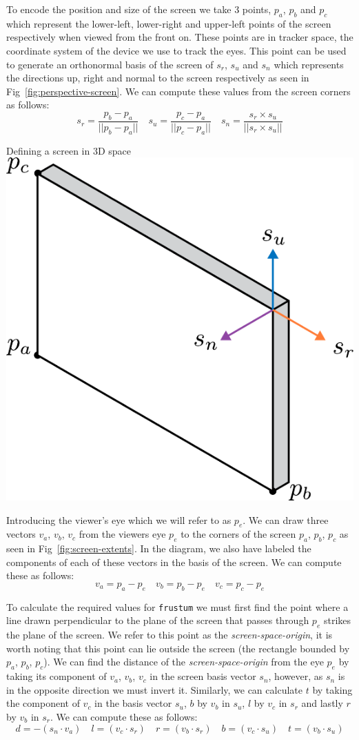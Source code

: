 To encode the position and size of the screen we take 3 points, $p_a$, $p_b$ and $p_c$ which represent the lower-left, lower-right and upper-left points of the screen respectively when viewed from the front on. These points are in tracker space, the coordinate system of the device we use to track the eyes. This point can be used to generate an orthonormal basis of the screen of $s_r$, $s_u$ and $s_n$ which represents the directions up, right and normal to the screen respectively as seen in Fig~\ref{fig:perspective-screen}. We can compute these values from the screen corners as follows:
\[s_r = \frac{p_b-p_a}{||p_b-p_a||} \quad s_u = \frac{p_c-p_a}{||p_c-p_a||} \quad s_n = \frac{s_r\times s_u}{||s_r \times s_u||}\]

\begin{figureBox}[label={fig:perspective-screen}, width=0.8\linewidth]{Defining a screen in 3D space}
    \includegraphics[width = 0.3\linewidth]{./background/figures/projection/screen.pdf}
\end{figureBox}

Introducing the viewer's eye which we will refer to as $p_e$. We can draw three vectors $v_a$, $v_b$, $v_c$ from the viewers eye $p_e$ to the corners of the screen $p_a$, $p_b$, $p_c$ as seen in Fig~\ref{fig:screen-extents}. In the diagram, we also have labeled the components of each of these vectors in the basis of the screen. We can compute these as follows:
\[ v_a = p_a - p_e \quad v_b = p_b - p_e \quad v_c = p_c - p_e\] 

To calculate the required values for \texttt{frustum} we must first find the point where a line drawn perpendicular to the plane of the screen that passes through $p_e$ strikes the plane of the screen. We refer to this point as the {\it screen-space-origin}, it is worth noting that this point can lie outside the screen (the rectangle bounded by $p_a$, $p_b$, $p_c$). We can find the distance of the {\it screen-space-origin} from the eye $p_e$ by taking its component of $v_a$, $v_b$, $v_c$ in the screen basis vector $s_n$, however, as $s_n$ is in the opposite direction we must invert it. Similarly, we can calculate $t$ by taking the component of $v_c$ in the basis vector $s_u$, $b$ by $v_b$ in $s_u$, $l$ by $v_c$ in $s_r$ and lastly $r$ by $v_b$ in $s_r$. We can compute these as follows:
\[ d= -(s_n \cdot v_a) \quad l = (v_c \cdot s_r) \quad r = (v_b \cdot s_r) \quad b = (v_c \cdot s_u) \quad t = (v_b \cdot s_u) \]

